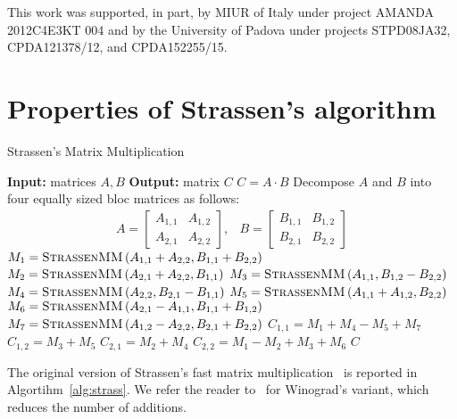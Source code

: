 \documentclass[a4paper,UKenglish]{lipics-v2016}
\begin{document}
This work was supported, in part, by MIUR of Italy under project
AMANDA 2012C4E3KT 004 and by the University of Padova under projects
STPD08JA32, CPDA121378/12, and CPDA152255/15.






\clearpage

\appendix
\section{Properties of Strassen's algorithm}

\begin{algorithm}
\caption{Strassen's Matrix Multiplication}\label{alg:strass}
\begin{algorithmic}[1]
	\Statex \textbf{Input:} matrices $A,B$
	\Statex \textbf{Output:} matrix $C$
	\State $C=A\cdot B$
	\Else
	\State Decompose $A$ and $B$ into four equally sized bloc matrices as follows:
	\Statex \begin{equation*}
\begin{array}{cc}
	A = \left[ \begin{array}{cc}
	A_{1,1} &A_{1,2} \\
	A_{2,1} &A_{2,2}
	\end{array}
	\right], & B = \left[ \begin{array}{cc}
	B_{1,1} &B_{1,2} \\
	B_{2,1} &B_{2,2}
	\end{array}
	\right]
\end{array}
\end{equation*}
\State $M_1 = \textsc{StrassenMM}\left(A_{1,1} + A_{2,2},B_{1,1} + B_{2,2}\right)$
\State $M_2 = \textsc{StrassenMM}\left(A_{2,1} + A_{2,2}, B_{1,1}\right)$
\State $M_3 = \textsc{StrassenMM}\left(A_{1,1},B_{1,2} - B_{2,2}\right)$
\State $M_4 = \textsc{StrassenMM}\left(A_{2,2},B_{2,1} - B_{1,1}\right)$
\State $M_5 = \textsc{StrassenMM}\left(A_{1,1} + A_{1,2}, B_{2,2}\right)$
\State $M_6 = \textsc{StrassenMM}\left(A_{2,1} - A_{1,1}, B_{1,1} + B_{1,2}\right)$
\State $M_7 = \textsc{StrassenMM}\left(A_{1,2} - A_{2,2}, B_{2,1} + B_{2,2}\right)$
\State $C_{1,1} = M_1 +M_4-M_5+M_7$ 
\State $C_{1,2} = M_3 + M_5$
\State $C_{2,1} = M_2 + M_4$
\State $C_{2,2} = M_1 -M_2 +M_3 +M_6$
\EndIf
\Return $C$
\EndProcedure
\end{algorithmic}
\end{algorithm}

The original version of  Strassen's fast matrix multiplication~\cite{strassen1969gaussian} is reported in Algortihm~\ref{alg:strass}. We refer the reader to~\cite{winograd1971multiplication} for
Winograd's variant, which reduces the number of additions. 
\end{document}
